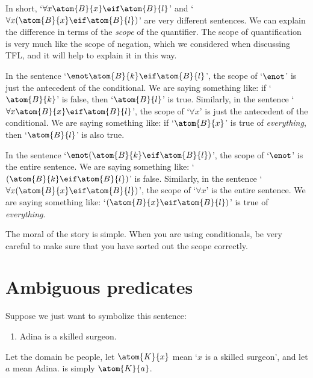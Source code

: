 In short, `$\forall x \atom{B}{x} \eif \atom{B}{l}$' and `$\forall x (\atom{B}{x} \eif \atom{B}{l})$' are very different sentences. We can explain the difference in terms of the \emph{scope} of the quantifier. The scope of quantification is very much like the scope of negation, which we considered when discussing TFL, and it will help to explain it in this way.

In the sentence `$\enot \atom{B}{k} \eif \atom{B}{l}$', the scope of `$\enot$' is just the antecedent of the conditional. We are saying something like: if `$\atom{B}{k}$' is false, then `$\atom{B}{l}$' is true. Similarly, in the sentence `$\forall x \atom{B}{x} \eif \atom{B}{l}$', the scope of `$\forall x$' is just the antecedent of the conditional. We are saying something like: if `$\atom{B}{x}$' is true of \emph{everything}, then `$\atom{B}{l}$' is also true.

In the sentence `$\enot(\atom{B}{k} \eif \atom{B}{l})$', the scope of `$\enot$' is the entire sentence. We are saying something like: `$(\atom{B}{k} \eif \atom{B}{l})$' is false. Similarly, in the sentence `$\forall x (\atom{B}{x} \eif \atom{B}{l})$', the scope of `$\forall x$' is the entire sentence. We are saying something like: `$(\atom{B}{x} \eif \atom{B}{l})$' is true of \emph{everything}.

The moral of the story is simple. When you are using conditionals, be very careful to make sure that you have sorted out the scope correctly.

\section{Ambiguous predicates}

Suppose we just want to symbolize this sentence:
\begin{enumerate}
\item\label{surgeon1} Adina is a skilled surgeon.
\end{enumerate}
Let the domain be people, let $\atom{K}{x}$ mean `$x$ is a skilled surgeon', and let $a$ mean Adina.  is simply $\atom{K}{a}$.


